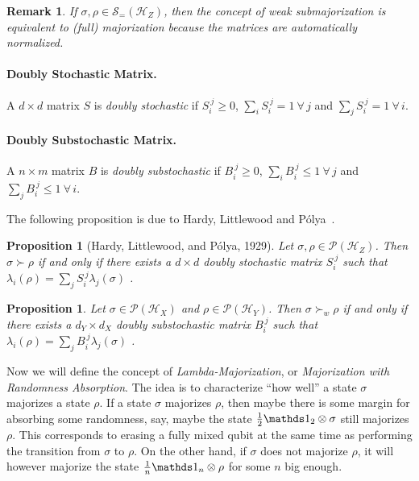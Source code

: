 \documentclass[10pt,letterpaper]{article}
\theoremstyle{plain}
\newtheorem{prop}[thm]{Proposition}
\newtheorem*{remark*}{Remark}
\def\Hs{\mathscr{H}}%
\newcommand{\POps}{\mathscr{P}}
\newcommand{\DOps}{\mathscr{S}_=}
\begin{document}
\begin{remark*}
  If $\sigma,\rho\in\DOps(\Hs_Z)$, then the concept of weak submajorization is equivalent to (full)
  majorization because the matrices are automatically normalized.
\end{remark*}

\paragraph{Doubly Stochastic Matrix.} A $d\times d$ matrix $S$ is {\em doubly stochastic} if
$S_i^{~j}\geqslant 0$, $\sum_i S_i^{~j} = 1~\forall\,j$ and $\sum_j S_i^{~j} = 1~\forall\,i$.

\paragraph{Doubly Substochastic Matrix.} A $n\times m$ matrix $B$ is {\em doubly substochastic} if
$B_i^{~j}\geqslant 0$, $\sum_i B_i^{~j} \leqslant 1~\forall\,j$ and $\sum_j B_i^{~j} \leqslant 1~\forall\,i$.

The following proposition is due to Hardy, Littlewood and P\'olya~\cite{HardyLittlewoodPolyaInequalities1952}.

\begin{prop}[Hardy, Littlewood, and P\'olya, 1929]
  \label{prop:MajDblStochEquiv}
  Let $\sigma,\rho \in \POps(\Hs_Z)$. Then $\sigma\succ\rho$ if and only if there exists a $d\times d$
  doubly stochastic matrix $S_i^{~j}$ such that $\lambda_i(\rho) = \sum_j S_i^{~j}\lambda_j(\sigma)$ .
\end{prop}

\begin{prop}
  \label{prop:WeakMajDblSubstochEquiv}
  Let $\sigma \in \POps(\Hs_X)$ and $\rho\in\POps(\Hs_Y)$. Then $\sigma\succ_w\rho$ if and only if there
  exists a $d_Y \times d_X$ doubly substochastic matrix $B_i^{~j}$ such that
  $\lambda_i(\rho) = \sum_j B_i^{~j}\lambda_j(\sigma)$ .
\end{prop}


Now we will define the concept of {\em Lambda-Majorization}, or {\em Majorization with Randomness Absorption}.
The idea is to characterize ``how well'' a state $\sigma$ majorizes a state $\rho$. If a state $\sigma$ majorizes
$\rho$, then maybe there is some margin for absorbing some randomness, say, maybe the state
$\frac12\Ident_2\otimes\sigma$ still majorizes $\rho$. This corresponds to erasing a fully mixed qubit at the same time
as performing the transition from $\sigma$ to $\rho$. On the other hand, if $\sigma$
does not majorize $\rho$, it will however majorize the state $\frac1n\Ident_n\otimes\rho$ for some $n$ big enough.
\end{document}
